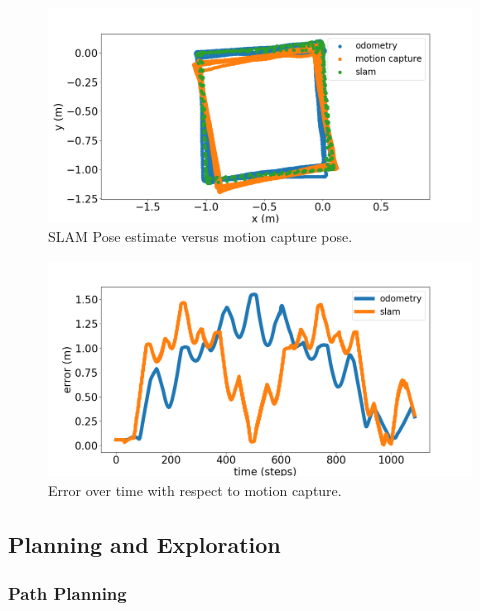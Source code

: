 \documentclass[journal]{IEEEtran}
\begin{document}
            \begin{figure}[t]
                \centering
                \includegraphics[width=1\linewidth]{slam_squares.png}
                \caption{SLAM Pose estimate versus motion capture pose.}
                \label{fig:slam_squares}
            \end{figure}
            
            \begin{figure}
                \centering
                \includegraphics[width=1\linewidth]{slam_squares_error.png}
                \caption{Error over time with respect to motion capture.}
                \label{fig:slam_squares_error.}
            \end{figure}
    
    \subsection{Planning and Exploration}
    
        \subsubsection{Path Planning}
        
\end{document}
